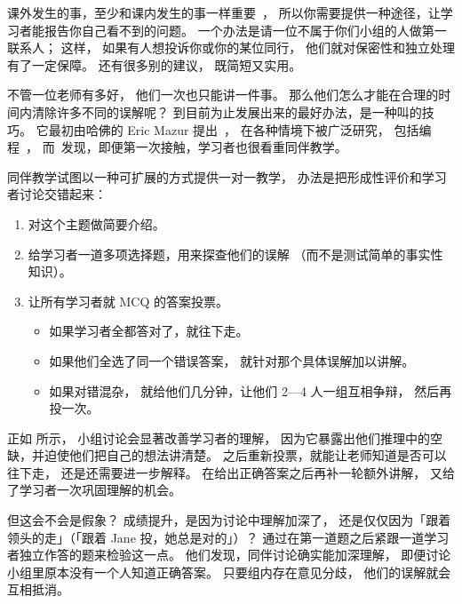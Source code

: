 课外发生的事，至少和课内发生的事一样重要~\cite{Part2011}，
所以你需要提供一种途径，让学习者能报告你自己看不到的问题。
一个办法是请一位不属于你们小组的人做第一联系人；
这样，
如果有人想投诉你或你的某位同行，
他们就对保密性和独立处理有了一定保障。
\cite{Auro2019}还有很多别的建议，
既简短又实用。


不管一位老师有多好，
他们一次也只能讲一件事。
那么他们怎么才能在合理的时间内清除许多不同的误解呢？
到目前为止发展出来的最好办法，是一种叫的技巧。
它最初由哈佛的 Eric Mazur 提出~\cite{Mazu1996}，
在各种情境下被广泛研究，
包括编程~\cite{Crou2001,Port2013}，
而~\cite{Port2016}发现，即便第一次接触，学习者也很看重同伴教学。

同伴教学试图以一种可扩展的方式提供一对一教学，
办法是把形成性评价和学习者讨论交错起来：

\begin{enumerate}

\item
  对这个主题做简要介绍。

\item
  给学习者一道多项选择题，用来探查他们的误解
  （而不是测试简单的事实性知识）。

\item
  让所有学习者就 MCQ 的答案投票。

  \begin{itemize}

  \item
    如果学习者全都答对了，就往下走。

  \item
    如果他们全选了同一个错误答案，
    就针对那个具体误解加以讲解。

  \item
    如果对错混杂，
    就给他们几分钟，让他们 2—4 人一组互相争辩，
    然后再投一次。

  \end{itemize}

\end{enumerate}

正如
所示，
小组讨论会显著改善学习者的理解，
因为它暴露出他们推理中的空缺，并迫使他们把自己的想法讲清楚。
之后重新投票，就能让老师知道是否可以往下走，
还是还需要进一步解释。
在给出正确答案之后再补一轮额外讲解，
又给了学习者一次巩固理解的机会。

但这会不会是假象？
成绩提升，是因为讨论中理解加深了，
还是仅仅因为「跟着领头的走」（「跟着 Jane 投，她总是对的」）？
\cite{Smit2009}通过在第一道题之后紧跟一道学习者独立作答的题来检验这一点。
他们发现，同伴讨论确实能加深理解，
即便讨论小组里原本没有一个人知道正确答案。
只要组内存在意见分歧，
他们的误解就会互相抵消。

